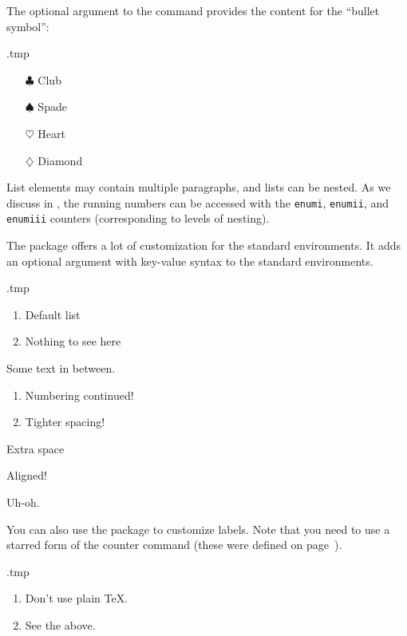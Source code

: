 The optional argument to the  command provides the content for the ``bullet symbol'':
%
\begin{VerbatimOut}{\jobname.tmp}
\begin{itemize}
\item[$\clubsuit$] Club
\item[$\spadesuit$] Spade
\item[$\heartsuit$] Heart
\item[$\diamondsuit$] Diamond
\end{itemize}
\end{VerbatimOut}
\ShowExample

List elements may contain multiple paragraphs,
and lists can be nested.
As we discuss in , the running numbers can be accessed
with the \verb|enumi|, \verb|enumii|, and \verb|enumiii| counters
(corresponding to levels of nesting).

The  package offers a lot of customization for the standard environments.
It adds an optional argument with key-value syntax to the standard environments.
\begin{VerbatimOut}{\jobname.tmp}
\begin{enumerate}
\item Default list
\item Nothing to see here
\end{enumerate}

Some text in between.

\begin{enumerate}
\item Numbering continued!
\item Tighter spacing!
\end{enumerate}

\begin{description}[labelwidth=2cm]
\item[Label] Extra space
\item[Long label] Aligned!
\item[Very long label] Uh-oh.
\end{description}
\end{VerbatimOut}
\ShowExample

You can also use the package to customize labels.
Note that you need to use a starred form of the counter command
(these were defined on page~\pageref{par:counter format}).
\begin{VerbatimOut}{\jobname.tmp}
\begin{enumerate}[noitemsep,
  format=\bfseries,
  label={Rule~\arabic*.}]
\item Don't use plain \TeX.
\item See the above.
\end{enumerate}
\end{VerbatimOut}
\ShowExample

